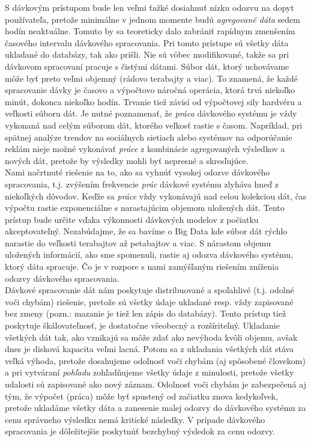 S dávkovým prístupom bude len veľmi ťažké dosiahnuť nízku odozvu na dopyt používateľa, pretože minimálne v jednom momente budú \textit{agregované dáta} sedem hodín neaktuálne. Tomuto by sa teoreticky dalo zabrániť rapídnym zmenšením časového intervalu dávkového spracovania.
Pri tomto prístupe sú všetky dáta ukladané do databázy, tak ako prišli. Nie sú vôbec modifikované, takže sa pri dávkovom spracovaní pracuje s čistými dátami. Súbor dát, ktorý uchovávame môže byť preto veľmi objemný (rádovo terabajty a viac). To znamená, že každé spracovanie dávky je časovo a výpočtovo náročná operácia, ktorá trvá niekoľko minút, dokonca niekoľko hodín. Trvanie tiež závisí od výpočtovej sily hardvéru a veľkosti súboru dát. Je nutné poznamenať, že \textit{práca} dávkového systému je vždy vykonaná nad celým súborom dát, ktorého veľkosť rastie s časom. Napríklad, pri spätnej analýze trendov na sociálnych sietiach alebo systémov na odporúčanie reklám nieje možné vykonávať \textit{práce} z kombinácie agregovaných výsledkov a nových dát, pretože by výsledky mohli byť nepresné a skresľujúce. 
\\[5pt]
Nami načrtnuté riešenie na to, ako sa vyhnúť vysokej odozve dávkového spracovania, t.j. zvýšením frekvencie \textit{prác} dávkové systému zlyháva hneď z niekoľkých dôvodov. Keďže sa \textit{práce} vždy vykonávajú nad celou kolekciou dát, čas výpočtu rastie exponenciálne s narastajúcim objemom uložených dát. Tento prístup bude určite vďaka výkonnosti dávkových modelov z počiatku akceptovateľný. Nezabúdajme, že sa bavíme o Big Data kde súbor dát rýchlo narastie do veľkosti terabajtov až petabajtov a viac. S nárastom objemu uložených informácií, ako sme spomenuli, rastie aj odozva dávkového systému, ktorý dáta spracuje. Čo je v rozpore s nami zamýšľaným riešením zníženia odozvy dávkového spracovania. 
\\[5pt]
Dávkové spracovanie dát nám poskytuje distribuované a spoľahlivé (t.j. odolné voči chybám) riešenie, pretože sú všetky údaje ukladané resp. vždy zapisované bez zmeny (pozn.: mazanie je tiež len zápis do databázy). Tento prístup tiež poskytuje škálovateľnosť, je dostatočne všeobecný a rozšíriteľný. 
Ukladanie všetkých dát tak, ako vznikajú sa môže zdať ako nevýhoda kvôli objemu, avšak dnes je disková kapacita veľmi lacná. Potom sa z ukladania všetkých dát stáva veľká výhoda, pretože  dosahujeme odolnosť voči chybám (aj spôsobené človekom) a pri vytváraní \textit{pohľadu} zohľadňujeme všetky údaje z minulosti, pretože všetky udalosti sú zapisované ako nový záznam. Odolnosť voči chybám je zabezpečená aj tým, že výpočet (práca) môže byť spustený od začiatku znova kedykoľvek, pretože ukladáme všetky dáta a zanesenie malej odozvy do dávkového systému za cenu správneho výsledku nemá kritické následky. V prípade dávkového spracovania je dôležitejšie poskytnúť bezchybný výsledok za cenu odozvy. 
